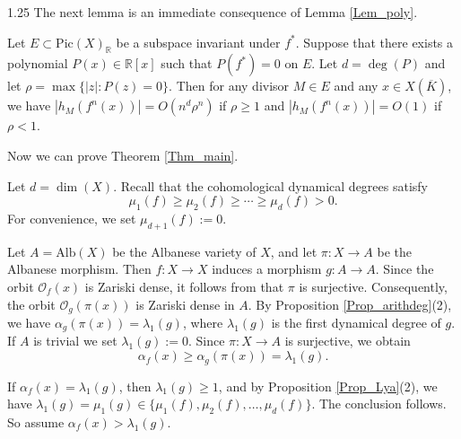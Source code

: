 \documentclass[12pt]{amsart}
\newcommand\mO{\mathcal{O}}
\newcommand{\mb}[1]{\mathbb{#1}}
\newcommand{\mr}[1]{\mathrm{#1}}
\newcommand{\ov}{\overline}
\newcommand\ra{\rightarrow}
\begin{document}
\begin{spacing}{1.25}
The next lemma is an immediate consequence of Lemma \ref{Lem_poly}.

\begin{corollary}\label{Cor_htbd}
Let $E\subset \mr{Pic}(X)_{\mb{R}}$ be a subspace invariant under $f^*$. Suppose that there exists a polynomial $P(x)\in\mathbb{R}[x]$ such that $P(f^*)=0$ on $E$. Let $d=\deg(P)$ and let $\rho=\max\{|z|:P(z)=0\}$. Then for any divisor $M\in E$ and any $x\in X(\ov{K})$, we have $|h_M(f^n(x))|=O(n^d\rho^n)$ if $\rho\geq1$ and $|h_M(f^n(x))|=O(1)$ if $\rho<1$.    
\end{corollary}
Now we can prove Theorem \ref{Thm_main}.

Let $d=\dim(X)$. Recall that the cohomological dynamical degrees satisfy
\[\mu_1(f)\geq \mu_2(f)\geq \cdots\geq \mu_d(f)>0.\]
For convenience, we set $\mu_{d+1}(f):=0$.

Let $A = \mathrm{Alb}(X)$ be the Albanese variety of $X$, and let $\pi: X \to A$ be the Albanese morphism. Then $f:X \to X$ induces a morphism $g: A \to A$. Since the orbit $\mO_f(x)$ is Zariski dense, it follows from \cite[Proposition 3.7]{LM21} that $\pi$ is surjective. Consequently, the orbit $\mO_g(\pi(x))$ is Zariski dense in $A$. By Proposition \ref{Prop_arithdeg}(2), we have $\alpha_g(\pi(x))=\lambda_1(g)$, where $\lambda_1(g)$ is the first dynamical degree of $g$. If $A$ is trivial we set $\lambda_1(g):=0$. Since $\pi: X\ra A$ is surjective, we obtain 
\[\alpha_f(x)\geq \alpha_g(\pi(x))=\lambda_1(g).\] 

If $\alpha_f(x)=\lambda_1(g)$, then $\lambda_1(g)\geq 1$, and by Proposition \ref{Prop_Lya}(2), we have $\lambda_1(g)=\mu_1(g)\in \{\mu_1(f), \mu_2(f), \ldots,\mu_d(f)\}$. The conclusion follows. So assume $\alpha_f(x)>\lambda_1(g)$. 


\end{spacing}
\end{document}
